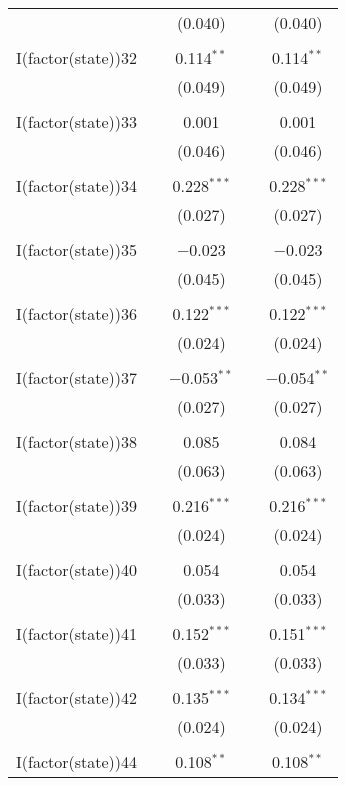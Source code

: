 \begin{table}[!htbp]
\begin{tabular}{@{\extracolsep{5pt}}lcccc}
  &  & (0.040) &  & (0.040) \\ 
  & & & & \\ 
 I(factor(state))32 &  & 0.114$^{**}$ &  & 0.114$^{**}$ \\ 
  &  & (0.049) &  & (0.049) \\ 
  & & & & \\ 
 I(factor(state))33 &  & 0.001 &  & 0.001 \\ 
  &  & (0.046) &  & (0.046) \\ 
  & & & & \\ 
 I(factor(state))34 &  & 0.228$^{***}$ &  & 0.228$^{***}$ \\ 
  &  & (0.027) &  & (0.027) \\ 
  & & & & \\ 
 I(factor(state))35 &  & $-$0.023 &  & $-$0.023 \\ 
  &  & (0.045) &  & (0.045) \\ 
  & & & & \\ 
 I(factor(state))36 &  & 0.122$^{***}$ &  & 0.122$^{***}$ \\ 
  &  & (0.024) &  & (0.024) \\ 
  & & & & \\ 
 I(factor(state))37 &  & $-$0.053$^{**}$ &  & $-$0.054$^{**}$ \\ 
  &  & (0.027) &  & (0.027) \\ 
  & & & & \\ 
 I(factor(state))38 &  & 0.085 &  & 0.084 \\ 
  &  & (0.063) &  & (0.063) \\ 
  & & & & \\ 
 I(factor(state))39 &  & 0.216$^{***}$ &  & 0.216$^{***}$ \\ 
  &  & (0.024) &  & (0.024) \\ 
  & & & & \\ 
 I(factor(state))40 &  & 0.054 &  & 0.054 \\ 
  &  & (0.033) &  & (0.033) \\ 
  & & & & \\ 
 I(factor(state))41 &  & 0.152$^{***}$ &  & 0.151$^{***}$ \\ 
  &  & (0.033) &  & (0.033) \\ 
  & & & & \\ 
 I(factor(state))42 &  & 0.135$^{***}$ &  & 0.134$^{***}$ \\ 
  &  & (0.024) &  & (0.024) \\ 
  & & & & \\ 
 I(factor(state))44 &  & 0.108$^{**}$ &  & 0.108$^{**}$ \\ 

\end{tabular}
\end{table}
